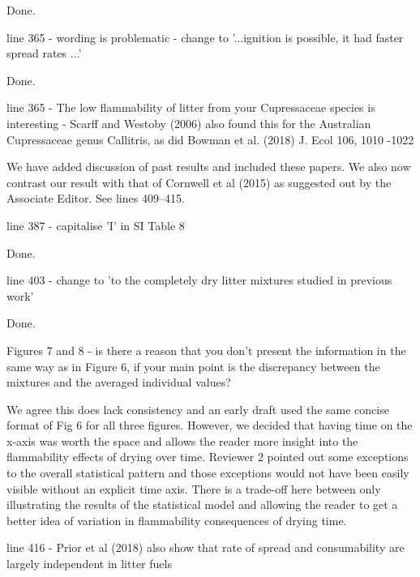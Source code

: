 \documentclass[letterpaper, 12pt]{letter}
\begin{document}
\begin{letter}{}
Done.

\begin{quoting}
  line 365 - wording is problematic - change to '...ignition is possible, it
  had faster spread rates ...'
\end{quoting}

Done. 

\begin{quoting}
  line 365 - The low flammability of litter from your Cupressaceae species is
  interesting - Scarff and Westoby (2006) also found this for the Australian
  Cupressaceae genus Callitris, as did Bowman et al. (2018) J. Ecol 106, 1010
  -1022
\end{quoting}

We have added discussion of past results and included these papers. We also now
contrast our result with that of Cornwell et al (2015) as suggested out by the
Associate Editor. See lines 409--415.

\begin{quoting}
line 387 - capitalise 'I' in SI Table  8
\end{quoting}

Done.

\begin{quoting}
line 403 - change to 'to the completely dry litter mixtures studied in previous work'
\end{quoting}

Done.

\begin{quoting}
  Figures 7 and 8 - is there a reason that you don't present the information in
  the same way as in Figure 6, if your main point is the discrepancy between
  the mixtures and the averaged individual values?
\end{quoting}

We agree this does lack consistency and an early draft used the same concise
format of Fig 6 for all three figures. However, we decided that having time on
the x-axis was worth the space and allows the reader more insight into the
flammability effects of drying over time. Reviewer 2 pointed out some
exceptions to the overall statistical pattern and those exceptions would not
have been easily visible without an explicit time axis. There is a trade-off
here between only illustrating the results of the statistical model and
allowing the reader to get a better idea of variation in flammability
consequences of drying time.

\begin{quoting}
  line 416 - Prior et al (2018) also show that rate of spread and consumability
  are largely independent in litter fuels
\end{quoting}


\end{letter}
\end{document}
